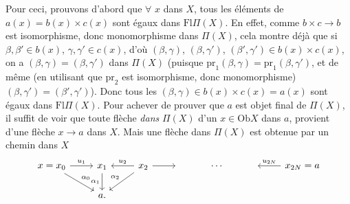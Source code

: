 \documentclass[11pt]{article}
\newcommand{\Fl}{\mathrm{Fl}}
\newcommand{\Ob}{\mathrm{Ob}}
\newcommand{\pr}{\mathrm{pr}}
\begin{document}
Pour ceci, prouvons d'abord que $\forall$ $x$ dans $X$, tous les éléments de $a(x) = b(x)\times c(x)$ sont égaux dans $\Fl\Pi(X)$. En effet, comme $b\times c \longrightarrow b$ est isomorphisme, donc monomorphisme dans $\Pi(X)$, cela montre déjà que si $\beta,\beta'\in b(x)$, $\gamma,\gamma'\in c(x)$, d'où $(\beta,\gamma)$, $(\beta,\gamma')$, $(\beta',\gamma')\in b(x)\times c(x)$, on a $(\beta,\gamma) = (\beta,\gamma')$ dans $\Pi(X)$ (puisque $\pr_1(\beta,\gamma) = \pr_1(\beta,\gamma')$, et de même (en utilisant que $\pr_2$ est isomorphisme, donc monomorphisme) $(\beta,\gamma') = (\beta',\gamma')$). Donc tous les $(\beta,\gamma)\in b(x)\times c(x) = a(x)$ sont égaux dans $\Fl\Pi(X)$. Pour achever de prouver que $a$ est objet final de $\Pi(X)$, il suffit de voir que toute flèche \textit{dans} $\Pi(X)$ d'un $x\in\Ob X$ dans $a$, provient d'une flèche $x\longrightarrow a$ dans $X$. Mais une flèche dans $\Pi(X)$ est obtenue par un chemin dans $X$
\[
\begin{tikzcd}
x = x_0 \arrow[r, "u_1"] \arrow[dr, "\alpha_0"] & x_1 \arrow[d, "\alpha_1"'] & x_2 \arrow[l, "u_2"'] \arrow[r] \arrow[dl, "\alpha_2"'] & {} & \cdots & {} & x_{2N} = a \arrow[l, "u_{2N}"'] \\
& a. & & & & &
\end{tikzcd}
\]
\end{document}
